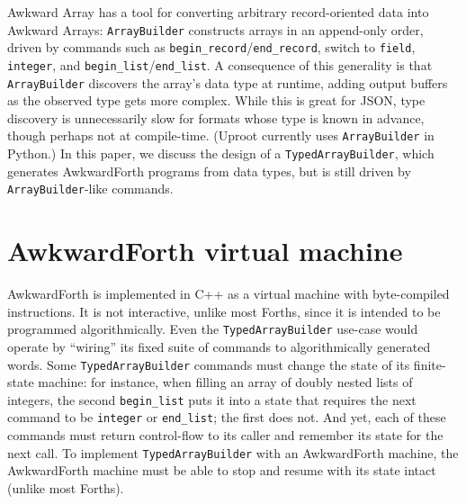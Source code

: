 \documentclass{webofc}
\begin{document}
Awkward Array has a tool for converting arbitrary record-oriented data into Awkward Arrays: \texttt{ArrayBuilder} constructs arrays in an append-only order, driven by commands such as \texttt{begin_record}/\texttt{end_record}, switch to \texttt{field}, \texttt{integer}, and \texttt{begin_list}/\texttt{end_list}. A consequence of this generality is that \texttt{ArrayBuilder} discovers the array's data type at runtime, adding output buffers as the observed type gets more complex. While this is great for JSON, type discovery is unnecessarily slow for formats whose type is known in advance, though perhaps not at compile-time. (Uproot currently uses \texttt{ArrayBuilder} in Python.) In this paper, we discuss the design of a \texttt{TypedArrayBuilder}, which generates AwkwardForth programs from data types, but is still driven by \texttt{ArrayBuilder}-like commands.

\section{AwkwardForth virtual machine}

AwkwardForth is implemented in C++ as a virtual machine with byte-compiled instructions. It is not interactive, unlike most Forths, since it is intended to be programmed algorithmically. Even the \texttt{TypedArrayBuilder} use-case would operate by ``wiring'' its fixed suite of commands to algorithmically generated words. Some \texttt{TypedArrayBuilder} commands must change the state of its finite-state machine: for instance, when filling an array of doubly nested lists of integers, the second \texttt{begin_list} puts it into a state that requires the next command to be \texttt{integer} or \texttt{end_list}; the first does not. And yet, each of these commands must return control-flow to its caller and remember its state for the next call. To implement \texttt{TypedArrayBuilder} with an AwkwardForth machine, the AwkwardForth machine must be able to stop and resume with its state intact (unlike most Forths).
\end{document}

